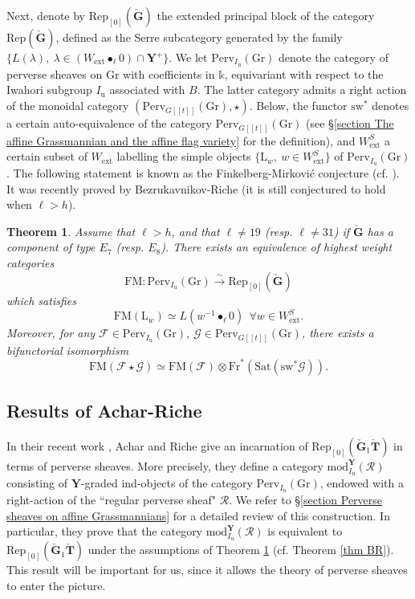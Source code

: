 \documentclass[11pt]{amsart}
\theoremstyle{plain}
\newtheorem{thm}{Theorem}[section]
\theoremstyle{remark}
\numberwithin{equation}{section}
\begin{document}
 Next, denote by $\mathrm{Rep}_{[0]}(\check{\mathbf{G}})$ the extended principal block of the category $\mathrm{Rep}(\check{\mathbf{G}})$, defined as the Serre subcategory generated by the family $\{L(\lambda),~\lambda\in (W_{\mathrm{ext}}\bullet_\ell 0)\cap\mathbf{Y}^+\}$. We let $\mathrm{Perv}_{I_\mathrm{u}}(\mathrm{Gr})$ denote the category of perverse sheaves on $\mathrm{Gr}$ with coefficients in $\mathbb{k}$, equivariant with respect to the Iwahori subgroup $I_\mathrm{u}$ associated with $B$. The latter category admits a right action of the monoidal category  $(\mathrm{Perv}_{G[[t]]}(\mathrm{Gr}),\star)$. Below, the functor $\mathrm{sw}^*$ denotes a certain auto-equivalence of the category $\mathrm{Perv}_{G[[t]]}(\mathrm{Gr})$ (see §\ref{section The affine Grassmannian and the affine flag variety} for the definition), and $W^S_\mathrm{ext}$ a certain subset of $W_\mathrm{ext}$ labelling the simple objects $\{\mathrm{L}_w,~w\in W^S_\mathrm{ext}\}$ of $\mathrm{Perv}_{I_\mathrm{u}}(\mathrm{Gr})$.  The following statement is known as the Finkelberg-Mirkovi\'c conjecture (cf. \cite[§1.5]{finkelberg1997semiinfinite}). It was recently proved by Bezrukavnikov-Riche (it is still conjectured to hold when $\ell>h$).  
	\begin{thm}\label{conj FM}
		Assume that $\ell> h$, and that $\ell\neq19$ (resp. $\ell\neq31$) if $\check{\mathbf{G}}$ has a component of type $E_7$ (resp. $E_8$). There exists an equivalence of highest weight categories
		$$\mathrm{FM}:\mathrm{Perv}_{I_\mathrm{u}}(\mathrm{Gr})\xrightarrow{\sim} \mathrm{Rep}_{[0]}(\check{\mathbf{G}}) $$
		which satisfies
		$$\mathrm{FM}(\mathrm{L}_w)\simeq L(w^{-1}\bullet_\ell0)~~\forall  w\in W^S_\mathrm{ext}.$$
		Moreover, for any $\mathcal{F}\in \mathrm{Perv}_{I_\mathrm{u}}(\mathrm{Gr}),~\mathcal{G}\in \mathrm{Perv}_{G[[t]]}(\mathrm{Gr})$, there exists a bifunctorial isomorphism
		$$\mathrm{FM}(\mathcal{F}\star \mathcal{G})\simeq \mathrm{FM}(\mathcal{F})\otimes \mathrm{Fr}^*(\mathrm{Sat}(\mathrm{sw}^*\mathcal{G})).$$
	\end{thm}

\subsection{Results of Achar-Riche}
In their recent work \cite{achar2022geometric}, Achar and Riche give an incarnation of $\mathrm{Rep}_{[0]}(\check{\mathbf{G}}_1\check{\mathbf{T}})$ in terms of perverse sheaves. More precisely, they define a category $\mathrm{mod}^\mathbf{Y}_{I_\mathrm{u}}(\mathcal{R})$ consisting of $\mathbf{Y}$-graded ind-objects of the category $\mathrm{Perv}_{I_\mathrm{u}}(\mathrm{Gr})$, endowed with a right-action of the ``regular perverse sheaf" $\mathcal{R}$. We refer to §\ref{section Perverse sheaves on affine Grassmannians} for a detailed review of this construction. In particular, they prove that the category $\mathrm{mod}^\mathbf{Y}_{I_\mathrm{u}}(\mathcal{R})$ is equivalent to $\mathrm{Rep}_{[0]}(\check{\mathbf{G}}_1\check{\mathbf{T}})$ under the assumptions of Theorem \ref{conj FM} (cf. Theorem \ref{thm BR}). This result will be important for us, since it allows the theory of perverse sheaves to enter the picture.
  
\end{document}
